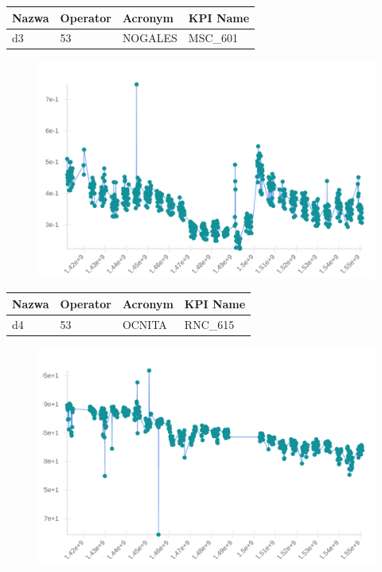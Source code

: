 \documentclass[eng,printmode]{mgr}
\begin{document}
\begingroup
\fontsize{10pt}{12pt}\selectfont
\begin{tabu} to 0.9\textwidth { | X[l] | X[l] | X[l] | X[l] |}
\hline
\textbf{Nazwa} & \textbf{Operator} & \textbf{Acronym} & \textbf{KPI Name} \\
\hline
d3 & 53 & NOGALES & MSC\_601 \\
\hline
\end{tabu}
\endgroup

\begin{figure}[H]
  \begin{center}
  \includegraphics[scale=0.4]{d3}
  \end{center}
\end{figure}
\newpage

\begingroup
\fontsize{10pt}{12pt}\selectfont
\begin{tabu} to 0.9\textwidth { | X[l] | X[l] | X[l] | X[l] |}
\hline
\textbf{Nazwa} & \textbf{Operator} & \textbf{Acronym} & \textbf{KPI Name} \\
\hline
d4 & 53 & OCNITA & RNC\_615\\
\hline
\end{tabu}
\endgroup

\begin{figure}[H]
  \begin{center}
  \includegraphics[scale=0.53]{d4}
  \end{center}
\end{figure}
\newpage
\end{document}
